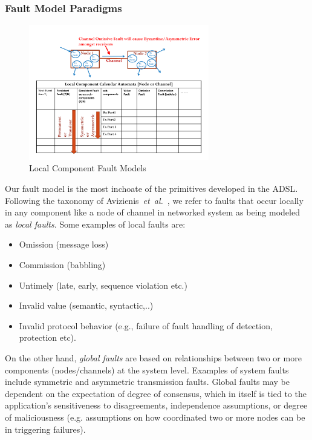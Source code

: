 \subsubsection{Fault Model Paradigms}
\label{ssec:fault}

\begin{figure}
\begin{center}
\includegraphics[width=0.7\textwidth]{figures/local_faults.pdf}
\caption{Local Component Fault Models}
\label{fig:local_faults}
\end{center}
\end{figure}

Our fault model is the most inchoate of the primitives developed in the
ADSL. Following the taxonomy of Avizienis~\emph{et~al.}~\cite{taxonomy}, we
refer to faults that occur locally in any component like a node of channel in
networked system as being modeled as \emph{local faults}. Some examples of local
faults are:
\begin{itemize}
  \item Omission (message loss)
  \item Commission (babbling)
  \item Untimely (late, early, sequence violation etc.)
  \item Invalid value (semantic, syntactic,..)
  \item Invalid protocol behavior (e.g., failure of fault handling of detection, protection etc).
\end{itemize}

On the other hand, \emph{global faults} are based on relationships between two
or more components (nodes/channels) at the system level. Examples of system
faults include symmetric and asymmetric transmission faults. Global faults may
be dependent on the expectation of degree of consensus, which in itself is tied
to the application's sensitiveness to disagreements, independence assumptions,
or degree of maliciousness (e.g. assumptions on how coordinated two or more
nodes can be in triggering failures).

